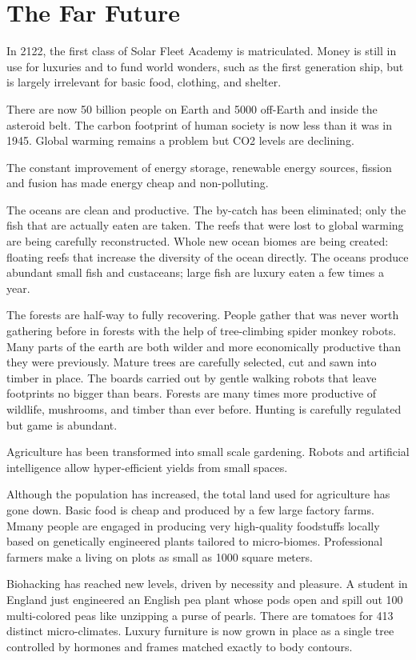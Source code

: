 \documentclass[
	fontsize=10pt, %
	twoside=false, %
	secnumdepth=1, %
]{kaobook}
\begin{document}
\section{The Far Future}

In 2122, the first class of Solar Fleet Academy is matriculated.
Money is still in use for luxuries and to fund world wonders,
such as the first generation ship, but is largely irrelevant
for basic food, clothing, and shelter.

There are now 50 billion people on Earth and 5000 off-Earth
and inside the asteroid belt. The carbon footprint of human
society is now less than it was in 1945. Global warming
remains a problem but CO2 levels are declining.

The constant improvement of energy storage, renewable energy sources, fission and fusion
has made energy cheap and non-polluting.

The oceans are clean and productive. The by-catch has been
eliminated; only the fish that are actually eaten are taken.
The reefs that were lost to global warming are being carefully
reconstructed.
Whole new ocean biomes are being created: floating reefs
that increase the diversity of the ocean directly.
The oceans produce abundant small fish and custaceans; large fish are luxury
eaten a few times a year.

The forests are half-way to fully recovering.
People gather that was never worth gathering before in forests
with the help of tree-climbing spider monkey robots.
Many parts
of the earth are both wilder and more economically productive than
they were previously.
Mature trees are carefully selected, cut and sawn into timber
in place.
The boards carried out by gentle walking robots that leave footprints
no bigger than bears.
Forests are many times more productive of wildlife, mushrooms, and timber
than ever before.
Hunting is carefully regulated but game is abundant.

Agriculture has been transformed into small scale gardening.
Robots and
artificial intelligence allow hyper-efficient yields from small
spaces.

Although the population has increased, the total land
used for agriculture has gone down.
Basic food is cheap and produced by a few large factory farms.
Mmany people are engaged in producing
very high-quality foodstuffs locally based on genetically engineered
plants tailored to micro-biomes.
Professional farmers make a living on plots as small as 1000 square meters.

Biohacking has reached new levels, driven by necessity and
pleasure.
A student in England just engineered an English pea plant
whose pods open and spill out 100 multi-colored peas like unzipping
a purse of pearls.
There are tomatoes for 413 distinct micro-climates.
Luxury furniture is now grown in place as a single tree
controlled by hormones and frames
matched exactly to body contours.
\end{document}
